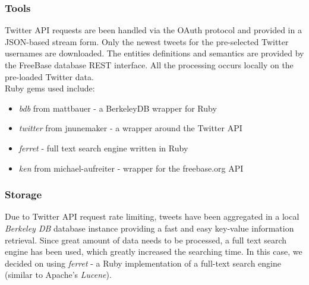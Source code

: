 \documentclass{article}
\begin{document}
\subsubsection{Tools}
Twitter API requests are been handled via the OAuth protocol and provided in a JSON-based stream form. Only the newest tweets for the pre-selected Twitter usernames are downloaded. The entities definitions and semantics are provided by the FreeBase database REST interface. All the processing occurs locally on the pre-loaded Twitter data. \\ Ruby gems used include:
\begin{itemize}
  \item \textit{bdb} from mattbauer - a BerkeleyDB wrapper for Ruby
  \item \textit{twitter} from jnunemaker - a wrapper around the Twitter API
  \item \textit{ferret} - full text search engine written in Ruby
  \item \textit{ken} from michael-aufreiter - wrapper for the freebase.org API
\end{itemize}
\subsubsection{Storage}
Due to Twitter API request rate limiting, tweets have been aggregated in a local
\textit{Berkeley DB} database instance providing a fast and easy key-value
information retrieval. Since great amount of data needs to be processed, a full
text search engine has been used, which greatly increased the searching time. In
this case, we decided on using \textit{ferret} - a Ruby implementation of a
full-text search engine (similar to Apache's \textit{Lucene}).



\end{document}
